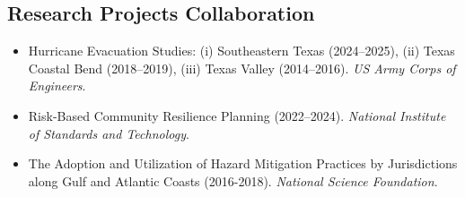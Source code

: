 \documentclass[11pt]{article}
\begin{document}
\subsection*{Research Projects Collaboration}
\begin{itemize}[leftmargin=20pt]
\item Hurricane Evacuation Studies: (i) Southeastern Texas (2024--2025), (ii) Texas Coastal Bend (2018--2019), (iii) Texas Valley (2014--2016). \emph{US Army Corps of Engineers}.
\item Risk-Based Community Resilience Planning (2022--2024). \emph{National Institute of Standards and Technology}.
\item The Adoption and Utilization of Hazard Mitigation Practices by Jurisdictions along Gulf and Atlantic Coasts (2016-2018). \emph{National Science Foundation}.
\end{itemize}
\end{document}
